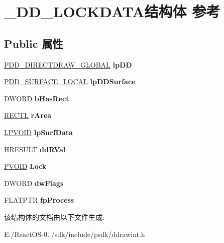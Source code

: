 \hypertarget{struct___d_d___l_o_c_k_d_a_t_a}{}\section{\+\_\+\+D\+D\+\_\+\+L\+O\+C\+K\+D\+A\+T\+A结构体 参考}
\label{struct___d_d___l_o_c_k_d_a_t_a}
\subsection*{Public 属性}
\begin{DoxyCompactItemize}
\item 
\mbox{\label{struct___d_d___l_o_c_k_d_a_t_a_ac12056da4c364dee2449aad0be8f0ca6}} 
\hyperlink{struct___d_d___d_i_r_e_c_t_d_r_a_w___g_l_o_b_a_l}{P\+D\+D\+\_\+\+D\+I\+R\+E\+C\+T\+D\+R\+A\+W\+\_\+\+G\+L\+O\+B\+AL} {\bfseries lp\+DD}
\item 
\mbox{\label{struct___d_d___l_o_c_k_d_a_t_a_a2bba3dcf6bd576678a5fef773b957b99}} 
\hyperlink{struct___d_d___s_u_r_f_a_c_e___l_o_c_a_l}{P\+D\+D\+\_\+\+S\+U\+R\+F\+A\+C\+E\+\_\+\+L\+O\+C\+AL} {\bfseries lp\+D\+D\+Surface}
\item 
\mbox{\label{struct___d_d___l_o_c_k_d_a_t_a_a7ac3d7a66a3a4c66fb0c9beedfdb84f5}} 
D\+W\+O\+RD {\bfseries b\+Has\+Rect}
\item 
\mbox{\label{struct___d_d___l_o_c_k_d_a_t_a_a72b8cd18a70bec57479064d9b54f757d}} 
\hyperlink{struct___r_e_c_t_l}{R\+E\+C\+TL} {\bfseries r\+Area}
\item 
\mbox{\label{struct___d_d___l_o_c_k_d_a_t_a_a1be835a6ece0bee7ff9978fe3b716724}} 
\hyperlink{interfacevoid}{L\+P\+V\+O\+ID} {\bfseries lp\+Surf\+Data}
\item 
\mbox{\label{struct___d_d___l_o_c_k_d_a_t_a_a3aee8ba64949591730a29b381116f055}} 
H\+R\+E\+S\+U\+LT {\bfseries dd\+R\+Val}
\item 
\mbox{\label{struct___d_d___l_o_c_k_d_a_t_a_a64ca9dfa5851240636f801b4afb82a96}} 
\hyperlink{interfacevoid}{P\+V\+O\+ID} {\bfseries Lock}
\item 
\mbox{\label{struct___d_d___l_o_c_k_d_a_t_a_a97ddb1e229f168387fc93cd0894896a2}} 
D\+W\+O\+RD {\bfseries dw\+Flags}
\item 
\mbox{\label{struct___d_d___l_o_c_k_d_a_t_a_a91296eb9d5ad8ae2cf03a6f9cccadf85}} 
F\+L\+A\+T\+P\+TR {\bfseries fp\+Process}
\end{DoxyCompactItemize}


该结构体的文档由以下文件生成\+:\begin{DoxyCompactItemize}
\item 
E\+:/\+React\+O\+S-\/0../sdk/include/psdk/ddrawint.\+h\end{DoxyCompactItemize}
